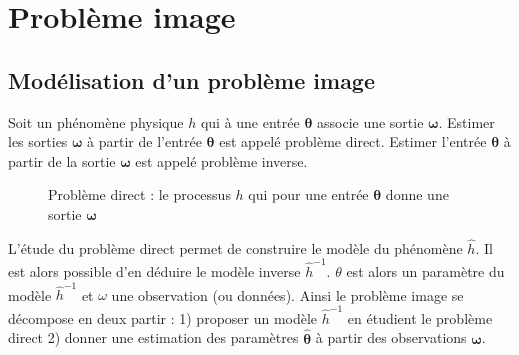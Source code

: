 \documentclass[../main/These_Mathias_Paget.tex]{subfiles}
\begin{document}



\section{Problème image}

\subsection{Modélisation d'un problème image}

Soit un phénomène physique $h$ qui à une entrée $\boldsymbol{\theta}$ associe une sortie $\boldsymbol{\omega}$. Estimer les sorties $\boldsymbol{\omega}$ à partir de l'entrée $\boldsymbol{\theta}$ est appelé problème direct. Estimer l'entrée $\boldsymbol{\theta}$ à partir de la sortie $\boldsymbol{\omega}$ est appelé problème inverse. 



\begin{figure}[h]
\begin{center}
\end{center}
\caption{Problème direct : le processus $h$ qui pour une entrée $\boldsymbol{\theta}$ donne une sortie $\boldsymbol{\omega}$}
\end{figure}

	L’étude du problème direct permet de construire le modèle du phénomène $\hat{h}$. Il est alors possible d'en déduire le modèle inverse $\hat{h}^{-1}$. $\theta$ est alors un paramètre du modèle $\hat{h}^{-1}$ et $\omega$ une observation (ou données). Ainsi le problème image se décompose en deux partir : 1) proposer un modèle $\hat{h}^{-1}$ en étudient le problème direct 2) donner une estimation des paramètres $\hat{\boldsymbol{\theta}}$ à partir des observations $\boldsymbol{\omega}$.
\end{document}
